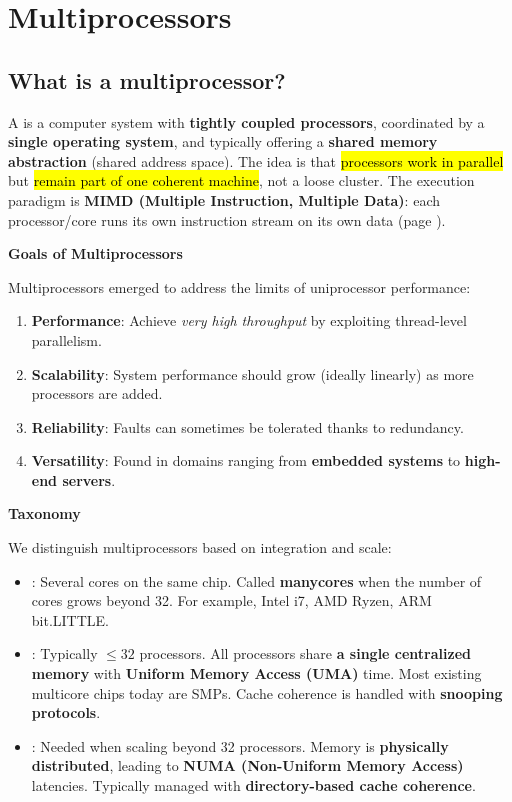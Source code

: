 \section{Multiprocessors}

\subsection{What is a multiprocessor?}

A  is a computer system with \textbf{tightly coupled processors}, coordinated by a \textbf{single operating system}, and typically offering a \textbf{shared memory abstraction} (shared address space). The idea is that \hl{processors work in parallel} but \hl{remain part of one coherent machine}, not a loose cluster. The execution paradigm is \textbf{MIMD (Multiple Instruction, Multiple Data)}: each processor/core runs its own instruction stream on its own data (page \pageref{def: MIMD}).

\highspace
\begin{flushleft}
    \textcolor{Green3}{ \textbf{Goals of Multiprocessors}}
\end{flushleft}
Multiprocessors emerged to address the limits of uniprocessor performance:
\begin{enumerate}
    \item \textbf{Performance}: Achieve \emph{very high throughput} by exploiting thread-level parallelism.
    \item \textbf{Scalability}: System performance should grow (ideally linearly) as more processors are added.
    \item \textbf{Reliability}: Faults can sometimes be tolerated thanks to redundancy.
    \item \textbf{Versatility}: Found in domains ranging from \textbf{embedded systems} to \textbf{high-end servers}.
\end{enumerate}

\highspace
\begin{flushleft}
    \textcolor{Green3}{ \textbf{Taxonomy}}
\end{flushleft}
We distinguish multiprocessors based on integration and scale:
\begin{itemize}
    \item {}: Several cores on the same chip. Called \textbf{manycores} when the number of cores grows beyond 32. For example, Intel i7, AMD Ryzen, ARM bit.LITTLE.
    \item {}: Typically $\le 32$ processors. All processors share \textbf{a single centralized memory} with \textbf{Uniform Memory Access (UMA)} time. Most existing multicore chips today are SMPs. Cache coherence is handled with \textbf{snooping protocols}.
    \item {}: Needed when scaling beyond 32 processors. Memory is \textbf{physically distributed}, leading to \textbf{NUMA (Non-Uniform Memory Access)} latencies. Typically managed with \textbf{directory-based cache coherence}.
\end{itemize}

